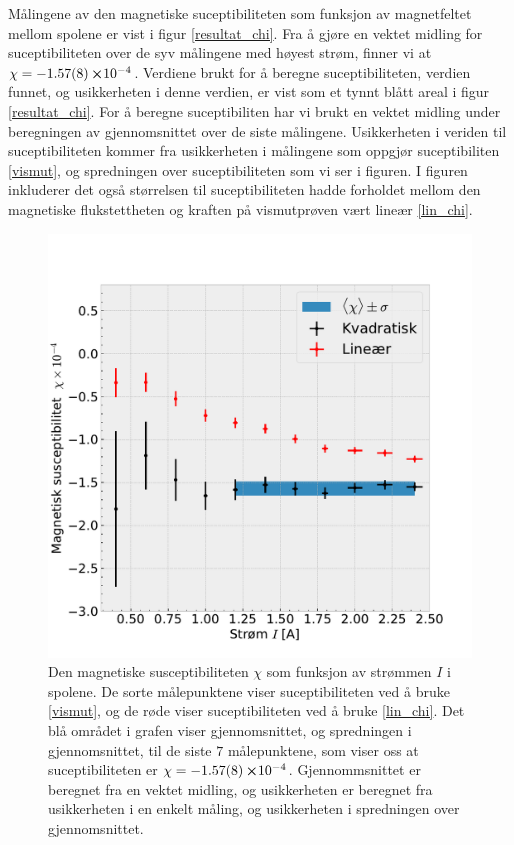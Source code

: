 \documentclass[%
 reprint,
 amsmath,amssymb,
 aps,
]{revtex4-1}
\begin{document}
Målingene av den magnetiske suceptibiliteten som funksjon av magnetfeltet mellom spolene er vist i figur \vref{resultat_chi}. Fra å gjøre en vektet midling for suceptibiliteten over de syv målingene med høyest strøm, finner vi at $\chi = -\SI{1.57\pm0.08}\cross 10^{-4}$.
Verdiene brukt for å beregne suceptibiliteten, verdien funnet, og usikkerheten i denne verdien, er vist som et tynnt blått areal i figur \vref{resultat_chi}. For å beregne suceptibiliten har vi brukt en vektet midling under beregningen av gjennomsnittet over de siste målingene. Usikkerheten i veriden til suceptibiliteten kommer fra usikkerheten i målingene som oppgjør suceptibiliten \eqref{vismut}, og spredningen over suceptibiliteten som vi ser i figuren. I figuren inkluderer det også størrelsen til suceptibiliteten hadde forholdet mellom den magnetiske flukstettheten og kraften på vismutprøven vært lineær \eqref{lin_chi}.
\begin{figure}[h!]
  \centering
  \includegraphics[scale=0.4]{chi_effekt.pdf}
  \caption{Den magnetiske susceptibiliteten $\chi$ som funksjon av strømmen $I$ i spolene. De sorte målepunktene viser suceptibiliteten ved å bruke \eqref{vismut}, og de røde viser suceptibiliteten ved å bruke \eqref{lin_chi}. Det blå området i grafen viser gjennomsnittet, og spredningen i gjennomsnittet, til de siste $7$ målepunktene, som viser oss at suceptibiliteten er $\chi = -\SI{1.57\pm0.08}\cross 10^{-4}$. Gjennommsnittet er beregnet fra en vektet midling, og usikkerheten er beregnet fra usikkerheten i en enkelt måling, og usikkerheten i spredningen over gjennomsnittet.}
  \label{resultat_chi}
\end{figure}
\end{document}
